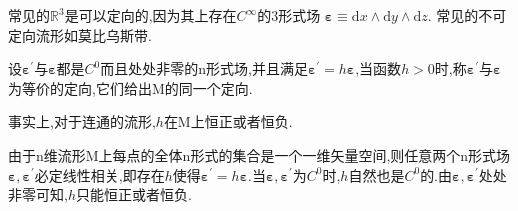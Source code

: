 \begin{remark}
常见的$\mathbb{R}^3$是可以定向的,因为其上存在$C^\infty$的3形式场 $\boldsymbol{\varepsilon}\equiv\mathrm{d}x\wedge\mathrm{d}y\wedge\mathrm{d}z$.
常见的不可定向流形如莫比乌斯带.
\end{remark}
设$\boldsymbol{\varepsilon^\prime}$与$\boldsymbol{\varepsilon}$都是$C^0$而且处处非零的n形式场,并且满足$\boldsymbol{\varepsilon^\prime}=h\boldsymbol{\varepsilon}$,当函数$h>0$时,称$\boldsymbol{\varepsilon^\prime}$与$\boldsymbol{\varepsilon}$为等价的定向,它们给出M的同一个定向.
\begin{remark}
事实上,对于连通的流形,$h$在M上恒正或者恒负.

由于n维流形M上每点的全体n形式的集合是一个一维矢量空间,则任意两个n形式场$\boldsymbol{\varepsilon},\boldsymbol{\varepsilon^\prime}$必定线性相关,即存在$h$使得$\boldsymbol{\varepsilon^\prime}=h\boldsymbol{\varepsilon}$.当$\boldsymbol{\varepsilon},\boldsymbol{\varepsilon^\prime}$为$C^0$时,$h$自然也是$C^0$的.由$\boldsymbol{\varepsilon},\boldsymbol{\varepsilon^\prime}$处处非零可知,$h$只能恒正或者恒负. 
\end{remark}

